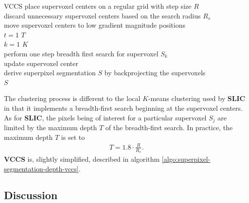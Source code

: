 \begin{algorithm}[t]
	\begin{algo}{VCCS}{\label{algo:superpixel-segmentation-depth-vccs}}
		place supervoxel centers on a regular grid with step size $R$\\
		discard unnecessary supervoxel centers based on the search radius $R_s$\\		
		move supervoxel centers to low gradient magnitude positions\\
		\qfor $t = 1$ \qto $T$ \\
			\qfor $k = 1$ \qto $K$\\
				perform one step breadth first search for supervoxel $S_k$\\
				update supervoxel center\qrof\qrof\\
		derive superpixel segmentation $S$ by backprojecting the supervoxels\\
		\qreturn $S$
	\end{algo}
	\caption[The supervoxel algorithm \textbf{VCCS} \cite{PaponAbramovSchoelerWoergoetter:2013}.]{\textbf{VCCS} uses $K$-means clustering based on breadth-first search beginning at the supervoxel centers to assign each voxel to a supervoxel. This way, \textbf{VCCS} ensures that the supervoxels represent connected components within the $26$-adjacency graph derived from the voxelized point cloud. The below algorithm can easily be adapted to return a supervoxel segmentation instead of a superpixel segmentation.}
	\label{fig:superpixel-segmentation-depth-vccs-breadth-first}
\end{algorithm}
The clustering process is different to the local $K$-means clustering used by \textbf{SLIC} in that it implements a breadth-first search beginning at the supervoxel centers. As for \textbf{SLIC}, the pixels being of interest for a particular supervoxel $S_j$ are limited by the maximum depth $T$ of the breadth-first search. In practice, the maximum depth $T$ is set to
\begin{align}
	T = 1.8 \cdot \frac{R}{R_v}.
\end{align}
\textbf{VCCS} is, slightly simplified, described in algorithm \ref{algo:superpixel-segmentation-depth-vccs}.

\subsection{Discussion}

